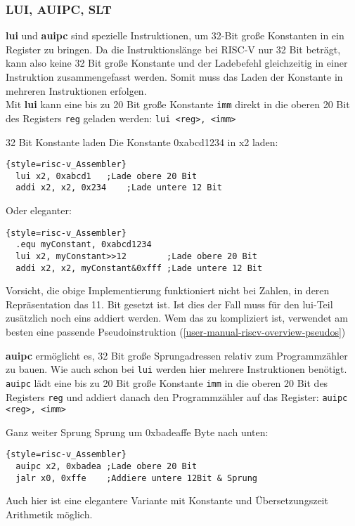 \subsubsection{LUI, AUIPC, SLT}
\textbf{lui} und \textbf{auipc} sind spezielle Instruktionen, um 32-Bit große Konstanten in ein Register zu bringen. Da die Instruktionslänge bei RISC-V nur 32 Bit beträgt, kann also keine 32 Bit große Konstante und der Ladebefehl gleichzeitig in einer Instruktion zusammengefasst werden. Somit muss das Laden der Konstante in mehreren Instruktionen erfolgen.\\

Mit \textbf{lui} kann eine bis zu 20 Bit große Konstante \texttt{imm} direkt in die oberen 20 Bit des Registers \texttt{reg} geladen werden:
\texttt{lui <reg>, <imm>}
\begin{exampleblock}{32 Bit Konstante laden}
Die Konstante 0xabcd1234 in x2 laden:\\
\begin{lstlisting}{style=risc-v_Assembler}
  lui x2, 0xabcd1 	;Lade obere 20 Bit
  addi x2, x2, 0x234	;Lade untere 12 Bit
\end{lstlisting}
Oder eleganter:
\begin{lstlisting}{style=risc-v_Assembler}	
  .equ myConstant, 0xabcd1234
  lui x2, myConstant>>12        ;Lade obere 20 Bit
  addi x2, x2, myConstant&0xfff ;Lade untere 12 Bit
\end{lstlisting}
Vorsicht, die obige Implementierung funktioniert nicht bei Zahlen, in deren Repräsentation das 11. Bit gesetzt ist. Ist dies der Fall muss für den lui-Teil zusätzlich noch eins addiert werden. Wem das zu kompliziert ist, verwendet am besten eine passende Pseudoinstruktion (\autoref{user-manual-riscv-overview-pseudos})
\end{exampleblock}
\textbf{auipc} ermöglicht es, 32 Bit große Sprungadressen relativ zum Programmzähler zu bauen. Wie auch schon bei \texttt{lui} werden hier mehrere Instruktionen benötigt. \texttt{auipc} lädt eine bis zu 20 Bit große Konstante \texttt{imm} in die oberen 20 Bit des Registers \texttt{reg} und addiert danach den Programmzähler auf das Register:
\texttt{auipc <reg>, <imm>}
\begin{exampleblock}{Ganz weiter Sprung}
Sprung um 0xbadeaffe Byte nach unten:
\begin{lstlisting}{style=risc-v_Assembler}
  auipc x2, 0xbadea	;Lade obere 20 Bit
  jalr x0, 0xffe	;Addiere untere 12Bit & Sprung
\end{lstlisting}
Auch hier ist eine elegantere Variante mit Konstante und Übersetzungszeit Arithmetik möglich.
\end{exampleblock}


